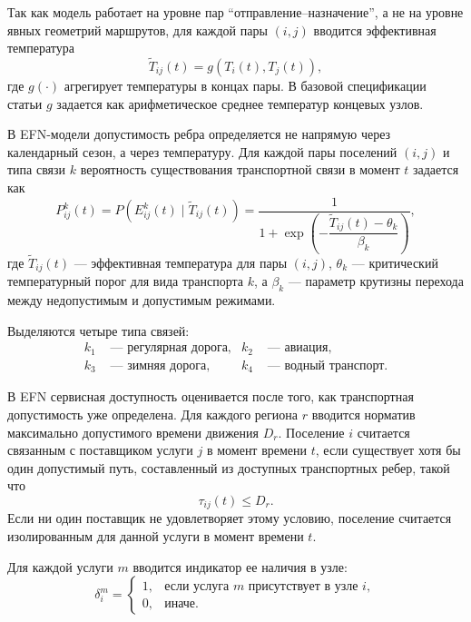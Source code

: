 Так как модель работает на уровне пар ``отправление--назначение'', а не на уровне
явных геометрий маршрутов, для каждой пары \((i,j)\) вводится эффективная
температура
\begin{equation}
\tilde{T}_{ij}(t)=g\!\left(T_i(t),T_j(t)\right),
\label{eq:effective-temperature}
\end{equation}
где \(g(\cdot)\) агрегирует температуры в концах пары. В базовой
спецификации статьи \(g\) задается как арифметическое среднее температур
концевых узлов.

В EFN-модели допустимость ребра определяется не напрямую через календарный
сезон, а через температуру. Для каждой пары поселений \((i,j)\) и типа
связи \(k\) вероятность существования транспортной связи в момент \(t\)
задается как
\begin{equation}
P_{ij}^{k}(t)=
P\!\left(E_{ij}^{k}(t) \mid \tilde{T}_{ij}(t)\right)=
\frac{1}{1+\exp\left(-\dfrac{\tilde{T}_{ij}(t)-\theta_k}{\beta_k}\right)},
\label{eq:arctic-edge-probability}
\end{equation}
где \(\tilde{T}_{ij}(t)\) --- эффективная температура для пары
\((i,j)\), \(\theta_k\) --- критический температурный порог для вида
транспорта \(k\), а \(\beta_k\) --- параметр крутизны перехода между
недопустимым и допустимым режимами.

Выделяются четыре типа связей:
\begin{equation}
\begin{aligned}
k_1 &\text{ --- регулярная дорога}, &
k_2 &\text{ --- авиация},\\
k_3 &\text{ --- зимняя дорога}, &
k_4 &\text{ --- водный транспорт}.
\end{aligned}
\label{eq:road-transport-edge-layers}
\end{equation}

В EFN сервисная доступность оценивается после того, как транспортная
допустимость уже определена. Для каждого региона \(r\) вводится норматив
максимально допустимого времени движения \(D_r\). Поселение \(i\) считается
связанным с поставщиком услуги \(j\) в момент времени \(t\), если существует
хотя бы один допустимый путь, составленный из доступных транспортных ребер,
такой что
\begin{equation}
\tau_{ij}(t)\leq D_r.
\end{equation}
Если ни один поставщик не удовлетворяет этому условию, поселение считается
изолированным для данной услуги в момент времени \(t\).

Для каждой услуги \(m\) вводится индикатор ее наличия в узле:
\begin{equation}
\delta_i^m =
\begin{cases}
1, & \text{если услуга } m \text{ присутствует в узле } i,\\
0, & \text{иначе}.
\end{cases}
\end{equation}

